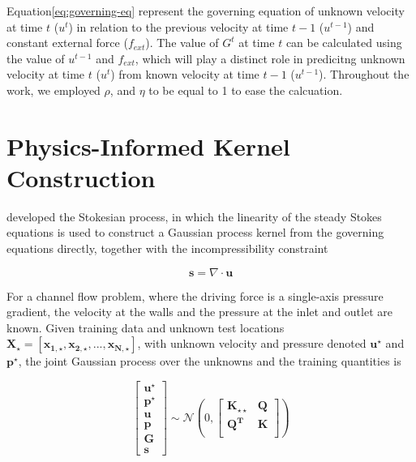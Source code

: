 \documentclass[11pt, a4paper]{report}
\begin{document}
\noindent Equation\eqref{eq:governing-eq} represent the governing equation of unknown velocity at time \(t\) (\(u^t\)) 
in relation to the previous velocity at time \(t-1\) (\(u^{t-1}\)) and constant external force (\(f_{ext}\)). 
The value of \({G^t}\) at time \(t\) can be calculated using the value of \(u^{t-1}\) and \(f_{ext}\),
which will play a distinct role in predicitng unknown velocity at time \(t\) (\(u^t\)) from known velocity at time \(t-1\) (\(u^{t-1}\)).
Throughout the work, we employed \(\rho\), and \(\eta\) to be equal to 1 to ease the calcuation.

\section{Physics-Informed Kernel Construction}%
\label{sec:kernel-construction}

\textcite{Molina2023} developed the Stokesian process, in which the linearity of the
steady Stokes equations is used to construct a Gaussian process kernel from the
governing equations directly, together with the incompressibility constraint

\begin{equation}
    \boldsymbol{s} = \nabla \cdot \boldsymbol{u}
    \label{eq:continuity}
\end{equation}

\noindent For a channel flow problem, where the driving force is a single-axis
pressure gradient, the velocity at the walls and the pressure at the inlet and outlet are known.
Given training data and unknown test locations
\(\boldsymbol{X_\star} = [\boldsymbol{x_{1,\star}},\boldsymbol{x_{2,\star}},...,\boldsymbol{x_{N,\star}}]\),
with unknown velocity and pressure denoted \(\boldsymbol{u^\star}\) and
\(\boldsymbol{p^\star}\), the joint Gaussian process over the unknowns and the training quantities is

\begin{equation}
    \begin{bmatrix}
        \boldsymbol{u^{\star}} \\
        \boldsymbol{p^{\star}} \\
        \boldsymbol{u} \\
        \boldsymbol{p} \\
        \boldsymbol{{G}} \\
        \boldsymbol{s}
    \end{bmatrix}
    \sim\mathcal{N}\left(0,
    \begin{bmatrix}
        \boldsymbol{K_{\star \star}} & \boldsymbol{Q}\\
        \boldsymbol{Q^T} & \boldsymbol{K} \\
    \end{bmatrix}
    \right)
\end{equation}
\end{document}
